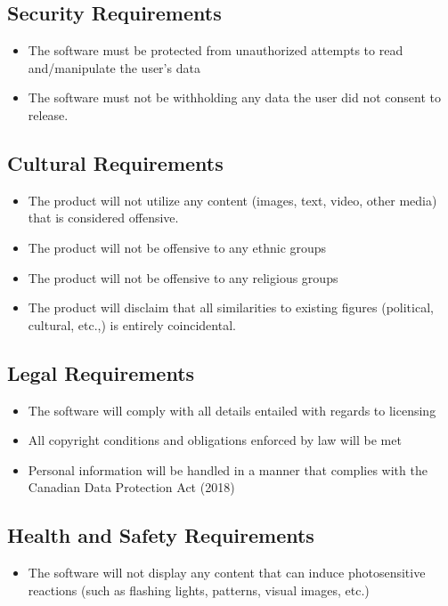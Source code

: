 \documentclass[12pt, titlepage]{article}
\begin{document}
\subsection{Security Requirements}
\begin{itemize}
\item The software must be protected from unauthorized attempts to read and/manipulate the user’s data
\item The software must not be withholding any data the user did not consent to release.
\end{itemize}

\subsection{Cultural Requirements}
\begin{itemize}
\item The product will not utilize any content (images, text, video, other media) that is considered offensive.
\item The product will not be offensive to any ethnic groups
\item The product will not be offensive to any religious groups
\item The product will disclaim that all similarities to existing figures (political, cultural, etc.,) is entirely coincidental. 
\end{itemize}
\subsection{Legal Requirements}
\begin{itemize}
\item The software will comply with all details entailed with regards to licensing 
\item All copyright conditions and obligations enforced by law will be met 
\item Personal information will be handled in a manner that complies with the Canadian Data Protection Act (2018)
\end{itemize}
\subsection{Health and Safety Requirements}
\begin{itemize}
\item The software will not display any content that can induce photosensitive reactions (such as flashing lights, patterns, visual images, etc.)
\end{itemize}
\end{document}
